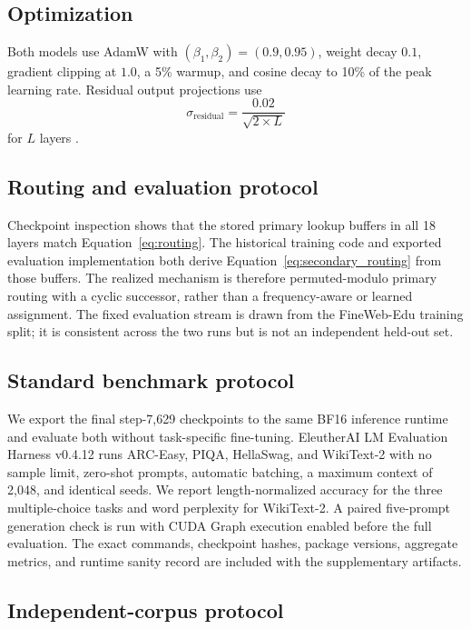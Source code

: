 \documentclass[10pt]{article}
\theoremstyle{definition}
\theoremstyle{remark}
\begin{document}
\subsection{Optimization}
\label{sec:training_recipe}

Both models use AdamW with $(\beta_1,\beta_2)=(0.9,0.95)$, weight decay $0.1$, gradient clipping at $1.0$, a 5\% warmup, and cosine decay to 10\% of the peak learning rate. Residual output projections use
\begin{equation}
\sigma_{\text{residual}} = \frac{0.02}{\sqrt{2 \times L}}
\end{equation}
for $L$ layers \citep{radford2019language}.

\subsection{Routing and evaluation protocol}
\label{sec:routing_verification}

Checkpoint inspection shows that the stored primary lookup buffers in all 18 layers match Equation~\ref{eq:routing}. The historical training code and exported evaluation implementation both derive Equation~\ref{eq:secondary_routing} from those buffers. The realized mechanism is therefore permuted-modulo primary routing with a cyclic successor, rather than a frequency-aware or learned assignment. The fixed evaluation stream is drawn from the FineWeb-Edu training split; it is consistent across the two runs but is not an independent held-out set.

\subsection{Standard benchmark protocol}
\label{sec:benchmark_protocol}

We export the final step-7,629 checkpoints to the same BF16 inference runtime and evaluate both without task-specific fine-tuning. EleutherAI LM Evaluation Harness v0.4.12 runs ARC-Easy, PIQA, HellaSwag, and WikiText-2 with no sample limit, zero-shot prompts, automatic batching, a maximum context of 2,048, and identical seeds. We report length-normalized accuracy for the three multiple-choice tasks and word perplexity for WikiText-2. A paired five-prompt generation check is run with CUDA Graph execution enabled before the full evaluation. The exact commands, checkpoint hashes, package versions, aggregate metrics, and runtime sanity record are included with the supplementary artifacts.

\subsection{Independent-corpus protocol}
\label{sec:heldout_protocol}
\end{document}

